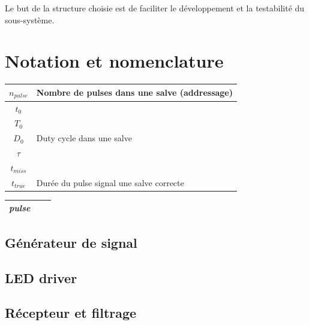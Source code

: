 \documentclass[french]{layout/Report}
\begin{document}
Le but de la structure choisie est de faciliter le développement et la testabilité
du sous-système.



\section{Notation et nomenclature}

\begin{center}
    \begin{tabular}{| c | l |}
        \hline
        $n_{pulse}$  & Nombre de pulses dans une salve (addressage) \\ \hline
        $t_0$               & \\ \hline
    $T_0$               & \\ \hline
    $D_0$               & Duty cycle dans une salve \\ \hline
    $\tau$          & \\ \hline
    $t_{miss}$  & \\ \hline
        $t_{true}$  & Durée du pulse signal une salve correcte \\ \hline
    \end{tabular}
\end{center}

\begin{center}
    \begin{tabular}{| c | l | c |}
        \textit{pulse}      &  \\ \hline
    \end{tabular}
\end{center}

\subsection{Générateur de signal}


\subsection{LED driver}

\subsection{Récepteur et filtrage}
\end{document}
